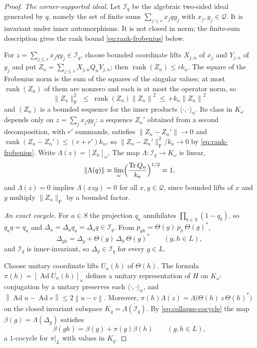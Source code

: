 \documentclass[11pt]{amsart}
\theoremstyle{definition}
\theoremstyle{remark}
\theoremstyle{plain}
\newcommand{\Ad}{\operatorname{Ad}}
\newcommand{\opnorm}[1]{\left\lVert #1\right\rVert}
\begin{document}
\begin{proof}
\emph{The corner-supported ideal.}  Let $\mathcal I_q$ be the
algebraic two-sided ideal generated by $q$, namely the set of finite
sums $\sum_{j\le r}x_jqy_j$ with $x_j,y_j\in\mathcal Q$.  It is
invariant under inner automorphisms.  It is not closed in norm; the
finite-sum description gives the rank bound \eqref{eq:rank-frobenius}
below.

For $z=\sum_{j\le r}x_jqy_j\in\mathcal I_q$, choose bounded coordinate
lifts $X_{j,n}$ of $x_j$ and $Y_{j,n}$ of $y_j$ and put
$Z_n=\sum_{j\le r}X_{j,n}Q_nY_{j,n}$; then
$\operatorname{rank}(Z_n)\le rk_n$.  The square of the Frobenius norm
is the sum of the squares of the singular values; at most
$\operatorname{rank}(Z_n)$ of them are nonzero and each is at most the
operator norm, so
\begin{equation}\label{eq:rank-frobenius}
 \lVert Z_n\rVert_{\mathrm F}^{2}
 \;\le\;\operatorname{rank}(Z_n)\opnorm{Z_n}^{2}
 \;\le\;r\,k_n\opnorm{Z_n}^{2}
\end{equation}
and $(Z_n)$ is a bounded sequence for the inner products
$\langle\cdot,\cdot\rangle_n$.  Its class in $K_\omega$ depends only on
$z=\sum_jx_jqy_j$: a sequence $Z_n'$ obtained from a second
decomposition, with $r'$ summands, satisfies $\opnorm{Z_n-Z_n'}\to0$
and $\operatorname{rank}(Z_n-Z_n')\le(r+r')k_n$, so
$\lVert Z_n-Z_n'\rVert_{\mathrm F}^{2}/k_n\to0$ by
\eqref{eq:rank-frobenius}.  Write $\Lambda(z)=[Z_n]_\omega$.  The map
$\Lambda\colon\mathcal I_q\to K_\omega$ is linear,
\[
 \lVert\Lambda(q)\rVert
 =\lim_\omega\Bigl(\frac{\operatorname{Tr}Q_n}{k_n}\Bigr)^{1/2}=1,
\]
and $\Lambda(z)=0$ implies $\Lambda(xzy)=0$ for all
$x,y\in\mathcal Q$, since bounded lifts of $x$ and $y$ multiply
$\lVert Z_n\rVert_{\mathrm F}$ by a bounded factor.

\emph{An exact cocycle.}  For $a\in S$ the projection $q_a$ annihilates
$\prod_{b\in S}(1-q_b)$, so $q_aq=q_a$ and
$\Delta_a=\Delta_aq_a=\Delta_aq\in\mathcal I_q$.  From
$p_{gh}=\Theta(g)\,p_h\,\Theta(g)^{*}$,
\begin{equation}\label{eq:collapse-cocycle}
 \Delta_{gh}=\Delta_g+\Theta(g)\,\Delta_h\,\Theta(g)^{*}\qquad(g,h\in L),
\end{equation}
and $\mathcal I_q$ is inner-invariant, so $\Delta_g\in\mathcal I_q$ for
every $g\in L$.

Choose unitary coordinate lifts $U_n(h)$ of $\Theta(h)$.  The formula
$\pi(h)=[\Ad U_n(h)]_\omega$ defines a unitary representation of $H$ on
$K_\omega$: conjugation by a unitary preserves each
$\langle\cdot,\cdot\rangle_n$, and
$\opnorm{\Ad u-\Ad v}\le2\opnorm{u-v}$.  Moreover,
$\pi(h)\Lambda(z)=\Lambda\bigl(\Theta(h)\,z\,\Theta(h)^{*}\bigr)$ on
the closed invariant subspace
$K_q=\overline{\Lambda(\mathcal I_q)}$.  By
\eqref{eq:collapse-cocycle} the map $\beta(g)=\Lambda(\Delta_g)$ satisfies
\[
 \beta(gh)=\beta(g)+\pi(g)\beta(h)\qquad(g,h\in L),
\]
a $1$-cocycle for $\pi|_L$ with values in $K_q$.


\end{proof}
\end{document}
